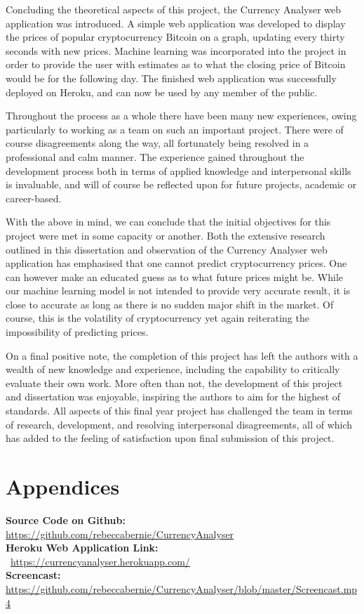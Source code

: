 Concluding the theoretical aspects of this project, the Currency Analyser web application was introduced. A simple web application was developed to display the prices of popular cryptocurrency Bitcoin on a graph, updating every thirty seconds with new prices. Machine learning was incorporated into the project in order to provide the user with estimates as to what the closing price of Bitcoin would be for the following day. The finished web application was successfully deployed on Heroku, and can now be used by any member of the public. 

Throughout the process as a whole there have been many new experiences, owing particularly to working as a team on such an important project. There were of course disagreements along the way, all fortunately being resolved in a professional and calm manner. The experience gained throughout the development process both in terms of applied knowledge and interpersonal skills is invaluable, and will of course be reflected upon for future projects, academic or career-based. 

With the above in mind, we can conclude that the initial objectives for this project were met in some capacity or another. Both the extensive research outlined in this dissertation and observation of the Currency Analyser web application has emphasised that one cannot predict cryptocurrency prices. One can however make an educated guess as to what future prices might be. While our machine learning model is not intended to provide very accurate result, it is close to accurate as long as there is no sudden major shift in the market. Of course, this is the volatility of cryptocurrency yet again reiterating the impossibility of predicting prices.

On a final positive note, the completion of this project has left the authors with a wealth of new knowledge and experience, including the capability to critically evaluate their own work. More often than not, the development of this project and dissertation was enjoyable, inspiring the authors to aim for the highest of standards. All aspects of this final year project has challenged the team in terms of research, development, and resolving interpersonal disagreements, all of which has added to the feeling of satisfaction upon final submission of this project.

\chapter{Appendices}

\textbf{Source Code on Github: }\\ \noindent\textcolor{NavyBlue}{\url{https://github.com/rebeccabernie/CurrencyAnalyser}}\\

\noindent\textbf{Heroku Web Application Link: }\\\ \noindent\textcolor{NavyBlue}{\url{https://currencyanalyser.herokuapp.com/}}\\

\noindent\textbf{Screencast: }\\ \noindent\textcolor{NavyBlue}{\url{https://github.com/rebeccabernie/CurrencyAnalyser/blob/master/Screencast.mp4}}

